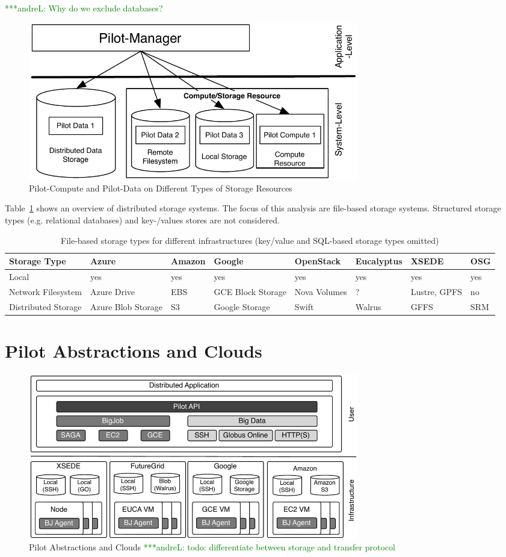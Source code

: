 \documentclass[times]{cpeauth}
\newcommand{\alnote}[1]{ {\textcolor{green} { ***andreL: #1 }}}
\newcommand{\alnote}[1]{}
\begin{document}
\alnote{Why do we exclude databases?}

\begin{figure}[t]
	\centering
		\includegraphics[width=0.7\textwidth]{figures/storage-types.pdf}
	\caption{Pilot-Compute and Pilot-Data on Different Types of Storage Resources}
	\label{fig:figures_storage-types}
\end{figure}

Table~\ref{tab:storage-systems} shows an overview of distributed storage 
systems. The focus of this analysis are file-based storage systems. Structured
storage types (e.g. relational databases) and key-/values stores are not 
considered.

\begin{table}[t]
\centering
\begin{tabular}{|p{1.7cm}|p{1.3cm}|p{1.3cm}|p{1.3cm}|p{1.4cm}|p{1.4cm}|p{1.3cm}|p{1.2cm}|}
	\hline
	\textbf{Storage Type} &\textbf{Azure} &\textbf{Amazon} &\textbf{Google} &\textbf{Open\-Stack} &\textbf{Euca\-lyptus} &\textbf{XSEDE}  &\textbf{OSG} \\
	\hline
	Local	&yes &yes &yes &yes &yes &yes &yes\\
	\hline
	Network Filesystem &Azure Drive &EBS &GCE Block Storage &Nova Volumes &? &Lustre, GPFS 
	&no\\
	\hline
	Distributed Storage &Azure Blob Storage &S3 &Google Storage &Swift & Walrus &GFFS
	 &SRM\\
	\hline	
\end{tabular}
\caption{File-based storage types for different infrastructures (key/value and 
SQL-based storage types omitted) \label{tab:storage-systems}}
\end{table}


\section{Pilot Abstractions and Clouds}


\begin{figure}[t]
	\centering
		\includegraphics[width=0.7\textwidth]{figures/cloud_pilot_job.pdf}
	\caption{Pilot Abstractions and Clouds\alnote{todo: differentiate between 
	storage and transfer protocol}}
	\label{fig:figures_cloud_pilot_job}
\end{figure}
\end{document}
